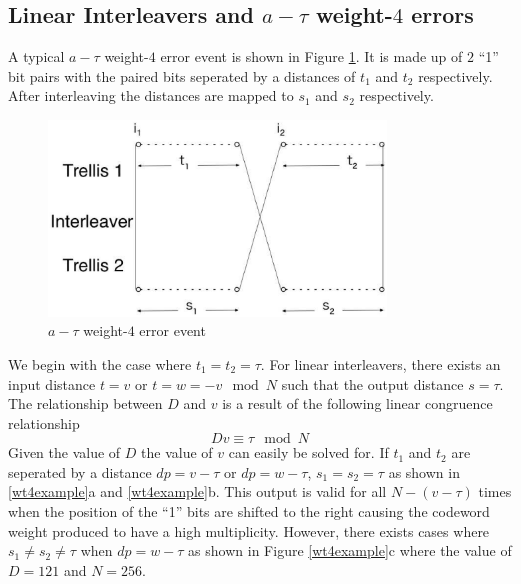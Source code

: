 \documentclass[a4paper, 12pt, oneside, openary]{jbook}
\begin{document}
\subsection{Linear Interleavers and $a-\tau$ weight-$4$ errors}\label{sstau}
A typical $a-\tau$ weight-$4$ error event is shown in Figure \ref{4_error}. It is made up of $2$ ``1'' bit pairs with the paired bits seperated by a distances of $t_1$ and $t_2$ respectively. After interleaving the distances are mapped to $s_1$ and $s_2$ respectively. 
\begin{figure}[h!]
\centering
\includegraphics[width=0.8\textwidth]{weight4.eps}
\caption{$a-\tau$ weight-$4$ error event}
\label{4_error}
\end{figure}
We begin with the case where $t_1 = t_2 =\tau$. 
For linear interleavers, there exists an input distance $t=v$ or $t=w=-v \mod N$ such that the output distance $s=\tau$. The relationship between $D$ and $v$ is a result of the following linear congruence relationship 
\begin{equation}
 Dv \equiv \tau \mod N
 \label{lincong}
 \end{equation}
Given the value of $D$ the value of $v$ can easily be solved for. If $t_1$ and $t_2$ are seperated by a distance $ dp= v - \tau$ or  $dp= w - \tau$,  $s_1 = s_2 =\tau$ as shown in
\ref{wt4example}a and \ref{wt4example}b. This output is valid for all $N-(v-\tau)$ times when the position of the ``1'' bits are shifted to the right causing the codeword weight produced to have a high multiplicity. However, there exists cases where $s_1 \neq s_2 \neq \tau$ when  $dp= w - \tau$ as shown in Figure \ref{wt4example}c where the value of $D=121$ and $N = 256$. 
\end{document}
